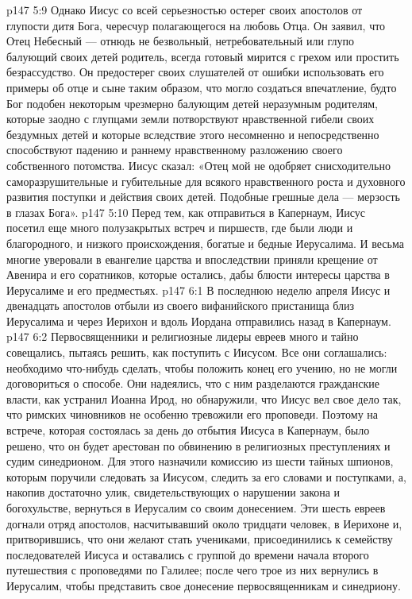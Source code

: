 \vs p147 5:9 Однако Иисус со всей серьезностью остерег своих апостолов от глупости дитя Бога, чересчур полагающегося на любовь Отца. Он заявил, что Отец Небесный --- отнюдь не безвольный, нетребовательный или глупо балующий своих детей родитель, всегда готовый мирится с грехом или простить безрассудство. Он предостерег своих слушателей от ошибки использовать его примеры об отце и сыне таким образом, что могло создаться впечатление, будто Бог подобен некоторым чрезмерно балующим детей неразумным родителям, которые заодно с глупцами земли потворствуют нравственной гибели своих бездумных детей и которые вследствие этого несомненно и непосредственно способствуют падению и раннему нравственному разложению своего собственного потомства. Иисус сказал: «Отец мой не одобряет снисходительно саморазрушительные и губительные для всякого нравственного роста и духовного развития поступки и действия своих детей. Подобные грешные дела --- мерзость в глазах Бога».
\vs p147 5:10 \pc Перед тем, как отправиться в Капернаум, Иисус посетил еще много полузакрытых встреч и пиршеств, где были люди и благородного, и низкого происхождения, богатые и бедные Иерусалима. И весьма многие уверовали в евангелие царства и впоследствии приняли крещение от Авенира и его соратников, которые остались, дабы блюсти интересы царства в Иерусалиме и его предместьях.
\vs p147 6:1 В последнюю неделю апреля Иисус и двенадцать апостолов отбыли из своего вифанийского пристанища близ Иерусалима и через Иерихон и вдоль Иордана отправились назад в Капернаум.
\vs p147 6:2 Первосвященники и религиозные лидеры евреев много и тайно совещались, пытаясь решить, как поступить с Иисусом. Все они соглашались: необходимо что\hyp{}нибудь сделать, чтобы положить конец его учению, но не могли договориться о способе. Они надеялись, что с ним разделаются гражданские власти, как устранил Иоанна Ирод, но обнаружили, что Иисус вел свое дело так, что римских чиновников не особенно тревожили его проповеди. Поэтому на встрече, которая состоялась за день до отбытия Иисуса в Капернаум, было решено, что он будет арестован по обвинению в религиозных преступлениях и судим синедрионом. Для этого назначили комиссию из шести тайных шпионов, которым поручили следовать за Иисусом, следить за его словами и поступками, а, накопив достаточно улик, свидетельствующих о нарушении закона и богохульстве, вернуться в Иерусалим со своим донесением. Эти шесть евреев догнали отряд апостолов, насчитывавший около тридцати человек, в Иерихоне и, притворившись, что они желают стать учениками, присоединились к семейству последователей Иисуса и оставались с группой до времени начала второго путешествия с проповедями по Галилее; после чего трое из них вернулись в Иерусалим, чтобы представить свое донесение первосвященникам и синедриону.
